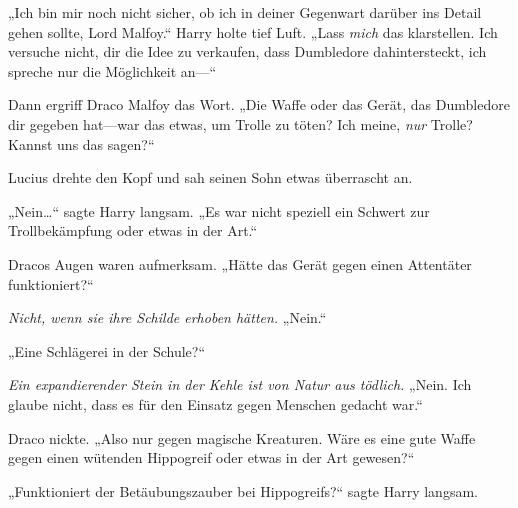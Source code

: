 „Ich bin mir noch nicht sicher, ob ich in deiner Gegenwart darüber ins Detail gehen sollte, Lord Malfoy.“
Harry holte tief Luft.
„Lass \emph{mich} das klarstellen. Ich versuche nicht, dir die Idee zu verkaufen, dass Dumbledore dahintersteckt, ich spreche nur die Möglichkeit an—“

Dann ergriff Draco Malfoy das Wort.
„Die Waffe oder das Gerät, das Dumbledore dir gegeben hat—war das etwas, um Trolle zu töten? Ich meine, \emph{nur} Trolle? Kannst uns das sagen?“

Lucius drehte den Kopf und sah seinen Sohn etwas überrascht an.

„Nein…“ sagte Harry langsam. „Es war nicht speziell ein Schwert zur Trollbekämpfung oder etwas in der Art.“

Dracos Augen waren aufmerksam.
„Hätte das Gerät gegen einen Attentäter funktioniert?“

\emph{Nicht, wenn sie ihre Schilde erhoben hätten.}
„Nein.“

„Eine Schlägerei in der Schule?“

\emph{Ein expandierender Stein in der Kehle ist von Natur aus tödlich.}
„Nein. Ich glaube nicht, dass es für den Einsatz gegen Menschen gedacht war.“

Draco nickte.
„Also nur gegen magische Kreaturen. Wäre es eine gute Waffe gegen einen wütenden Hippogreif oder etwas in der Art gewesen?“

„Funktioniert der Betäubungszauber bei Hippogreifs?“ sagte Harry langsam.

